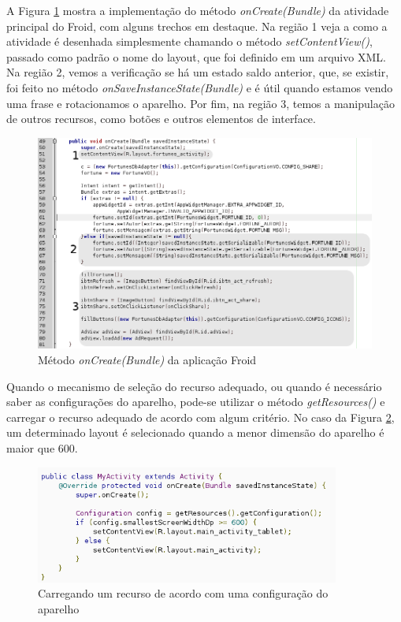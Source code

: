 A Figura \ref{onCreate} mostra a implementação do método {\it onCreate(Bundle)} da 
atividade principal do Froid, com alguns trechos em destaque. Na região 1 veja a 
como a atividade é desenhada simplesmente chamando o método {\it setContentView()}, 
passado como padrão o nome do layout, que foi definido em um arquivo XML. Na 
região 2, vemos a verificação se há um estado saldo anterior, que, se existir, foi 
feito no método {\it onSaveInstanceState(Bundle)} e é útil quando estamos vendo uma
frase e rotacionamos o aparelho. Por fim, na região 3, temos a manipulação de outros 
recursos, como botões e outros elementos de interface.

\begin{figure}[h]
    \centering
    \includegraphics[width=15cm]{img/onCreate_anotado}
    \caption{Método {\it onCreate(Bundle)} da aplicação Froid}
    \label{onCreate}
\end{figure}

Quando o mecanismo de seleção do recurso adequado, ou quando é necessário saber as 
configurações do aparelho, pode-se utilizar o método {\it getResources()} e carregar 
o recurso adequado de acordo com algum critério. No caso da Figura \ref{multiple_screens},
um determinado layout é selecionado quando a menor dimensão do aparelho é maior que 600.

\begin{figure}[h]
    \centering
    \includegraphics[width=10cm]{img/multiple_screens}
    \caption{Carregando um recurso de acordo com uma configuração do aparelho}
    \label{multiple_screens}
\end{figure}


